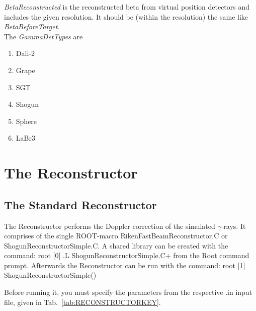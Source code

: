 \documentclass[12pt]{book}
\begin{document}
\textit{BetaReconstructed} is the reconstructed beta from virtual position detectors and includes the given resolution. It should be (within the resolution) the same like \textit{BetaBeforeTarget}.\\

The \textit{GammaDetTypes} are
\begin{enumerate}
	\item Dali-2
	\item Grape
	\item SGT
	\item Shogun
	\item Sphere
	\item LaBr3
\end{enumerate}








\chapter{The Reconstructor}

\section{The Standard Reconstructor}

The Reconstructor performs the Doppler correction of the simulated $\gamma$-rays.
It comprises of the single ROOT-macro {\ttfamily RikenFastBeamReconstructor.C} or
{\ttfamily ShogunReconstructorSimple.C}.
A shared library can be created with the command:\hfill{}
\linebreak \linebreak
{\ttfamily root [0] .L ShogunReconstructorSimple.C+
}
\linebreak
\linebreak
from the Root command prompt. Afterwards the Reconstructor can be run with the command:\hfill{}
\linebreak
\linebreak
{\ttfamily root [1] ShogunReconstructorSimple()
}
\linebreak
\linebreak

Before running it, you must specify the parameters from the respective {\ttfamily *.in} input
file, given in Tab.~\ref{tab:RECONSTRUCTORKEY}.
\end{document}
